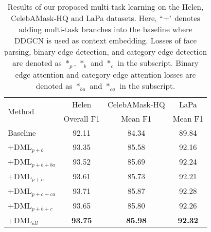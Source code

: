 \documentclass[10pt,twocolumn,letterpaper]{article}
\begin{document}
\begin{table}
  \small
  \centering
  \begin{tabular}[width=\linewidth]{ l|c|c|c } 
    \hline 
    \multirow{2}{4em}{Method} & {\footnotesize Helen} & {\footnotesize CelebAMask-HQ} & {\footnotesize LaPa}  \\
& {\footnotesize Overall F1} & {\footnotesize Mean F1} & {\footnotesize Mean F1}  \\
    \hline \hline
Baseline & 92.11 & 84.34 & 89.84 \\\hline
+DML$_{p+b}$  & 93.35 & 85.58 & 92.16 \\
+DML$_{p+b+ba}$ & 93.52 & 85.69  & 92.24   \\
+DML$_{p+c}$ &  93.61 &  85.73 &  92.21\\ 
+DML$_{p+c+ca}$  & 93.71 & 85.87 & 92.28 \\ 
+DML$_{p+b+c}$  & 93.65 & 85.80 & 92.26 \\ 
\hline
+DML$_{all}$  & \textbf{93.75} & \textbf{85.98} & \textbf{92.32} \\ 
\hline
\end{tabular}
\vspace{-2.5mm}
\caption{Results of our proposed multi-task learning on the Helen, CelebAMask-HQ and LaPa datasets. Here, ``+" denotes adding multi-task branches into the baseline where DDGCN is used as context embedding. Losses of face parsing, binary edge detection, and category edge detection are denoted as $*_p$, $*_b$ and $*_c$ in the subscript. Binary edge attention and category edge attention losses are denoted as $*_{ba}$ and $*_{ca}$ in the subscript.}
\label{tab:multi_task}
\vspace{-5mm}
\end{table}
\end{document}
